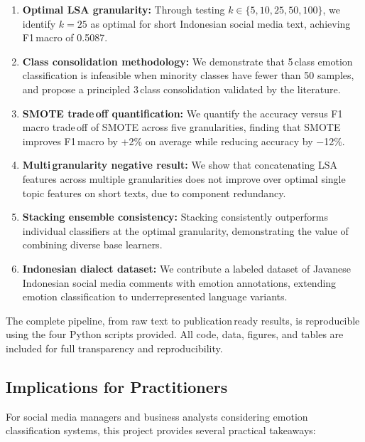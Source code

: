 \documentclass[12pt,a4paper,twoside]{article}
\theoremstyle{definition}
\begin{document}
\begin{enumerate}[leftmargin=2em]
    \item \textbf{Optimal LSA granularity:} Through testing $k \in \{5, 10, 25, 50, 100\}$, we identify $k=25$ as optimal for short Indonesian social media text, achieving F1\,macro of 0.5087.

    \item \textbf{Class consolidation methodology:} We demonstrate that 5\,class emotion classification is infeasible when minority classes have fewer than 50 samples, and propose a principled 3\,class consolidation validated by the literature.

    \item \textbf{SMOTE trade\,off quantification:} We quantify the accuracy versus F1\,macro trade\,off of SMOTE across five granularities, finding that SMOTE improves F1\,macro by +2\% on average while reducing accuracy by $-$12\%.

    \item \textbf{Multi\,granularity negative result:} We show that concatenating LSA features across multiple granularities does not improve over optimal single\,topic features on short texts, due to component redundancy.

    \item \textbf{Stacking ensemble consistency:} Stacking consistently outperforms individual classifiers at the optimal granularity, demonstrating the value of combining diverse base learners.

    \item \textbf{Indonesian dialect dataset:} We contribute a labeled dataset of Javanese\,Indonesian social media comments with emotion annotations, extending emotion classification to underrepresented language variants.
\end{enumerate}

The complete pipeline, from raw text to publication\,ready results, is reproducible using the four Python scripts provided. All code, data, figures, and tables are included for full transparency and reproducibility.



\subsection{Implications for Practitioners}
 
For social media managers and business analysts considering emotion classification systems, this project provides several practical takeaways:
 
\end{document}
